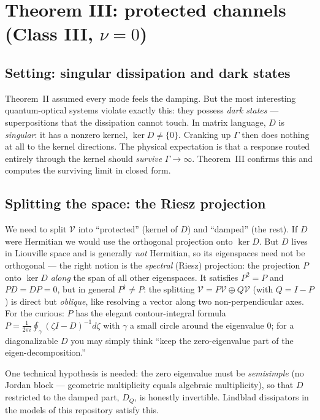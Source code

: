 \documentclass[11pt]{article}
\begin{document}
\section{Theorem III: protected channels (Class III, $\nu=0$)}
\label{sec:thm3}

\subsection{Setting: singular dissipation and dark states}

Theorem~II assumed every mode feels the damping.  But the most interesting
quantum-optical systems violate exactly this: they possess \emph{dark
states} --- superpositions that the dissipation cannot touch.  In matrix
language, $D$ is \emph{singular}: it has a nonzero kernel, $\ker D\neq\{0\}$.
Cranking up $\Gamma$ then does nothing at all to the kernel directions.  The
physical expectation is that a response routed entirely through the kernel
should \emph{survive} $\Gamma\to\infty$.  Theorem~III confirms this and
computes the surviving limit in closed form.

\subsection{Splitting the space: the Riesz projection}

We need to split $\mathcal V$ into ``protected'' (kernel of $D$) and
``damped'' (the rest).  If $D$ were Hermitian we would use the orthogonal
projection onto $\ker D$.  But $D$ lives in Liouville space and is generally
\emph{not} Hermitian, so its eigenspaces need not be orthogonal --- the right
notion is the \emph{spectral} (Riesz) projection: the projection $P$ onto
$\ker D$ \emph{along} the span of all other eigenspaces.
It satisfies $P^2=P$ and $PD=DP=0$, but in general $P^\dagger\ne P$: the
splitting $\mathcal V = P\mathcal V\oplus Q\mathcal V$ (with $Q=I-P$) is
direct but \emph{oblique}, like resolving a vector along two non-perpendicular
axes.  For the curious: $P$ has the elegant contour-integral formula
$P=\frac{1}{2\pi i}\oint_\gamma(\zeta I-D)^{-1}d\zeta$ with $\gamma$ a small
circle around the eigenvalue $0$; for a diagonalizable $D$ you may simply
think ``keep the zero-eigenvalue part of the eigen-decomposition.''

One technical hypothesis is needed: the zero eigenvalue must be
\emph{semisimple} (no Jordan block --- geometric multiplicity equals algebraic
multiplicity), so that $D$ restricted to the damped part, $D_Q$, is honestly
invertible.  Lindblad dissipators in the models of this repository satisfy
this.
\end{document}
